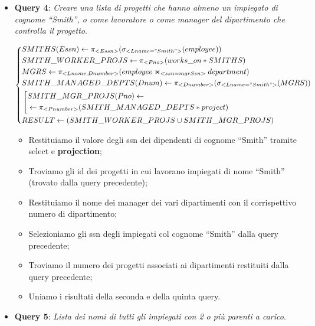 \begin{itemize}
\begin{itemize}
\end{itemize}


\item{\textbf{Query 4}}: \textit{Creare una lista di progetti che hanno almeno un impiegato di cognome “Smith”, o come lavoratore o come manager del dipartimento che controlla il progetto}.

\[
	\left\{
	\begin{aligned}
	&SMITHS(Essn) \leftarrow \pi_{<Essn>}(\sigma_{<Lname="Smith">}(employee))\\
	&SMITH\_WORKER\_PROJS \leftarrow \pi_{<Pno>}(works\_on * SMITHS)\\
	&MGRS \leftarrow \pi_{<Lname,Dnumber>}(employee \Join_{<ssn=mgrSsn>}department)\\
	&SMITH\_MANAGED\_DEPTS(Dnum) \leftarrow \pi_{<Dnumber>}(\sigma_{<Lname="Smith">}(MGRS))\\
	&\left[
	\begin{aligned}
	&SMITH\_MGR\_PROJS(Pno) \leftarrow\\
	&\leftarrow \pi_{<Pnumber>}(SMITH\_MANAGED\_DEPTS * project)
	\end{aligned}
	\right.\\
	&RESULT \leftarrow (SMITH\_WORKER\_PROJS \cup SMITH\_MGR\_PROJS)
	\end{aligned}
	\right.
\]

\begin{itemize}

\item Restituiamo il valore degli ssn dei dipendenti di cognome “Smith” tramite select e \textbf{projection};
\item Troviamo gli id dei progetti in cui lavorano impiegati di nome “Smith” (trovato dalla query precedente);
\item Restituiamo il nome dei manager dei vari dipartimenti con il corrispettivo numero di dipartimento;
\item Selezioniamo gli ssn degli impiegati col cognome “Smith” dalla query precedente;
\item Troviamo il numero dei progetti associati ai dipartimenti restituiti dalla query precedente;
\item Uniamo i risultati della seconda e della quinta query. 

\end{itemize}

\item{\textbf{Query 5}}: \textit{Lista dei nomi di tutti gli impiegati con 2 o più parenti a carico}.


\end{itemize}
